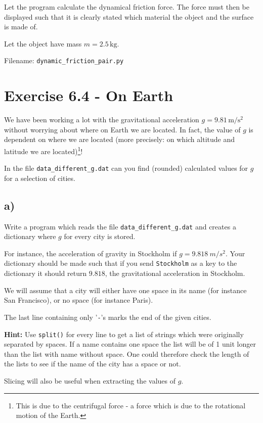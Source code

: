 \documentclass[10pt,a4paper]{article}
\begin{document}
Let the program calculate the dynamical friction force. The force must then be displayed such that it is clearly stated which material the object and the surface is made of. 

Let the object have mass $m = 2.5\,\si{\kg}$.

Filename: \texttt{dynamic\_friction\_pair.py}



\section*{Exercise 6.4 - On Earth}
We have been working a lot with the gravitational acceleration $g = 9.81\,\mathrm{m/s^2}$ without worrying about where on Earth we are located. In fact, the value of $g$ is dependent on where we are located (more precisely: on which altitude and latitude we are located)\footnote{This is due to the centrifugal force - a force which is due to the rotational motion of the Earth.}!

In the file \texttt{data\_different\_g.dat} can you find (rounded) calculated values for $g$ for a selection of cities.
\subsection*{a)}
Write a program which reads the file \texttt{data\_different\_g.dat} and creates a dictionary where $g$ for every city is stored. 

For instance, the acceleration of gravity in Stockholm if $g = \SI{9.818}{m/s^2}$. Your dictionary should be made such that if you send \texttt{Stockholm} as a key to the dictionary it should return $9.818$, the gravitational acceleration in Stockholm. 

We will assume that a city will either have one space in its name (for instance San Francisco), or no space (for instance Paris). 

The last line containing only '\texttt{-}'s marks the end of the given cities. 

\textbf{Hint: } Use \texttt{split()} for every line to get a list of strings which were originally separated by spaces. If a name contains one space the list will be of 1 unit longer than the list with name without space. One could therefore check the length of the lists to see if the name of the city has a space or not. 

Slicing will also be useful when extracting the values of $g$.
\end{document}
